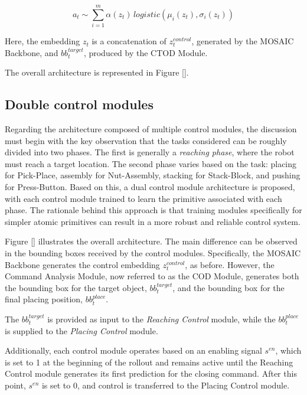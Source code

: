 \begin{equation}
    \label{equation:logistic_distribution}
    a_{t} \sim \sum_{i=1}^{m} \alpha(z_t) \, logistic(\mu_{i}(z_t), \sigma_{i}(z_t))
\end{equation}

Here, the embedding $z_t$ is a concatenation of $z^{control}_{t}$, generated by the MOSAIC Backbone, and $bb^{target}_t$, produced by the CTOD Module.

The overall architecture is represented in Figure \ref{}.

\subsection{Double control modules}
\label{sec:ocpl_architecture_dcm}
Regarding the architecture composed of multiple control modules, the discussion must begin with the key observation that the tasks considered can be roughly divided into two phases. The first is generally a \textit{reaching phase}, where the robot must reach a target location. The second phase varies based on the task: placing for Pick-Place, assembly for Nut-Assembly, stacking for Stack-Block, and pushing for Press-Button. Based on this, a dual control module architecture is proposed, with each control module trained to learn the primitive associated with each phase. The rationale behind this approach is that training modules specifically for simpler atomic primitives can result in a more robust and reliable control system.

Figure \ref{} illustrates the overall architecture. The main difference can be observed in the bounding boxes received by the control modules. Specifically, the MOSAIC Backbone generates the control embedding $z^{control}_t$, as before. However, the Command Analysis Module, now referred to as the COD Module, generates both the bounding box for the target object, $bb^{target}_t$, and the bounding box for the final placing position, $bb^{place}_t$. 

The $bb^{target}_t$ is provided as input to the \textit{Reaching Control} module, while the $bb^{place}_t$ is supplied to the \textit{Placing Control} module. 

Additionally, each control module operates based on an enabling signal $s^{en}$, which is set to 1 at the beginning of the rollout and remains active until the Reaching Control module generates its first prediction for the closing command. After this point, $s^{en}$ is set to 0, and control is transferred to the Placing Control module.    
